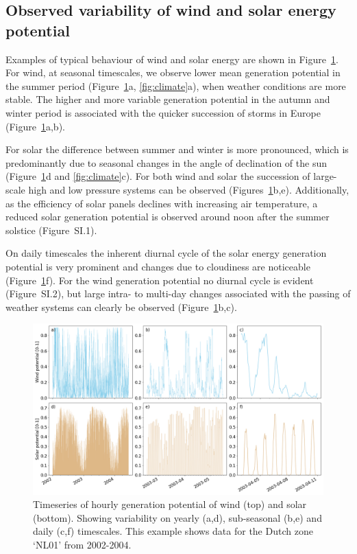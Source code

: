 \documentclass[a4paper,11pt]{extarticle}
\begin{document}
\subsection{Observed variability of wind and solar energy potential}\label{secCP2:variability}
Examples of typical behaviour of wind and solar energy are shown in Figure~\ref{fig:climatological_behaviour}. 
For wind, at seasonal timescales, we observe lower mean generation potential in the summer period (Figure~\ref{fig:climatological_behaviour}a, \ref{fig:climate}a), when weather conditions are more stable. 
The higher and more variable generation potential in the autumn and winter period is associated with the quicker succession of storms in Europe (Figure~\ref{fig:climatological_behaviour}a,b).

For solar the difference between summer and winter is more pronounced, which is predominantly due to seasonal changes in the angle of declination of the sun (Figure~\ref{fig:climatological_behaviour}d and \ref{fig:climate}c). 
For both wind and solar the succession of large-scale high and low pressure systems can be observed (Figures~\ref{fig:climatological_behaviour}b,e). 
Additionally, as the efficiency of solar panels declines with increasing air temperature, a reduced solar generation potential is observed around noon after the summer solstice (Figure~SI.1). 

On daily timescales the inherent diurnal cycle of the solar energy generation potential is very prominent and changes due to cloudiness are noticeable (Figure~\ref{fig:climatological_behaviour}f). 
For the wind generation potential no diurnal cycle is evident (Figure~SI.2), but large intra- to multi-day changes associated with the passing of weather systems can clearly be observed (Figure~\ref{fig:climatological_behaviour}b,c).

\begin{figure}[h]
        \centering
        \includegraphics[width=\textwidth]{Climatological_Behaviour}
        \caption{
                Timeseries of hourly generation potential of wind (top) and solar (bottom). 
                Showing variability on yearly (a,d), sub-seasonal (b,e) and daily (c,f) timescales. 
                This example shows data for the Dutch zone `NL01' from 2002-2004.}
        \label{fig:climatological_behaviour}
\end{figure}
\end{document}
